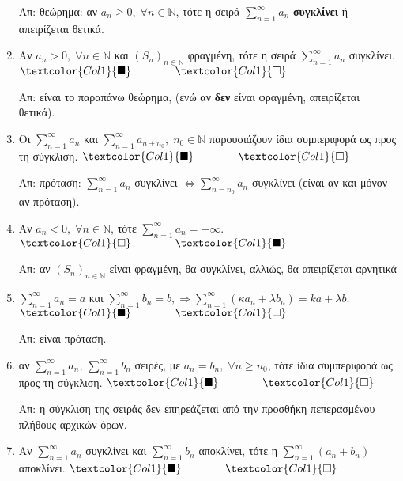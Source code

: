 \documentclass[a4paper,table]{report}
\begin{document}
\begin{enumerate}[itemsep=.5\baselineskip]
    Απ: θεώρημα: αν $ a_{n} \geq 0, \; \forall n \in \mathbb{N} $, τότε η σειρά 
    $ \sum_{n=1}^{\infty} a_{n} $ \textbf{συγκλίνει} ή απειρίζεται θετικά.

  \item \textcolor{Col1}{Αν $ a_{n} > 0, \; \forall n \in \mathbb{N} $ και $ {(S_{n})}_{n
    \in \mathbb{N}}$ φραγμένη, τότε η σειρά $ \sum_{n=1}^{\infty} a_{n} $ συγκλίνει}.
    \hfill $\textcolor{Col1}{\blacksquare} \qquad \qquad \textcolor{Col1}{\square}$

    Απ: είναι το παραπάνω θεώρημα, (ενώ αν \textbf{δεν} είναι φραγμένη, απειρίζεται 
    θετικά). 

  \item \textcolor{Col1}{Οι $ \sum_{n=1}^{\infty} a_{n} $ και $
      \sum_{n=1}^{\infty} a_{n+ n_{0}}, \; n_{0} \in \mathbb{N} $ 
    παρουσιάζουν ίδια συμπεριφορά ως προς τη σύγκλιση}.
    \hfill $\textcolor{Col1}{\blacksquare} \qquad \qquad \textcolor{Col1}{\square}$

    Απ: πρόταση: $ \sum_{n=1}^{\infty} a_{n} $ συγκλίνει $ \Leftrightarrow
    \sum_{n=n_{0}}^{\infty} a_{n} $ συγκλίνει (είναι αν και μόνον αν πρόταση).

  \item \textcolor{Col1}{Αν $ a_{n} < 0, \; \forall n \in \mathbb{N} $, τότε $
    \sum_{n=1}^{\infty} a_{n} = - \infty $}.
    \hfill $\textcolor{Col1}{\square} \qquad \qquad \textcolor{Col1}{\blacksquare}$

    Απ: αν $ {(S_{n})}_{n \in \mathbb{N}} $ είναι φραγμένη, θα συγκλίνει, 
    αλλιώς, θα απειρίζεται αρνητικά 

  \item \textcolor{Col1}{$ \sum_{n=1}^{\infty} a_{n} = a $ και $ \sum_{n=1}^{\infty}
      b_{n} = b, \Rightarrow \sum_{n=1}^{\infty} (\kappa a_{n} + \lambda b_{n}) 
    = k a + \lambda b $}.
    \hfill $\textcolor{Col1}{\blacksquare} \qquad \qquad \textcolor{Col1}{\square}$

    Απ: είναι πρόταση. 

  \item \textcolor{Col1}{αν $ \sum_{n=1}^{\infty} a_{n} $, $ \sum_{n=1}^{\infty} b_{n} $ 
    σειρές, με $ a_{n}=b_{n}, \; \forall n \geq n_{0} $, τότε ίδια συμπεριφορά ως προς τη
  σύγκλιση}.
    \hfill $\textcolor{Col1}{\blacksquare} \qquad \qquad \textcolor{Col1}{\square}$

    Απ: η σύγκλιση της σειράς δεν επηρεάζεται από την προσθήκη πεπερασμένου πλήθους
    αρχικών όρων.

  \item \textcolor{Col1}{Αν $ \sum_{n=1}^{\infty} a_{n}$ συγκλίνει και $
    \sum_{n=1}^{\infty} b_{n} $ αποκλίνει, τότε η 
  $ \sum_{n=1}^{\infty}(a_{n}+b_{n}) $ αποκλίνει}.
    \hfill $\textcolor{Col1}{\blacksquare} \qquad \qquad \textcolor{Col1}{\square}$


\end{enumerate}
\end{document}
